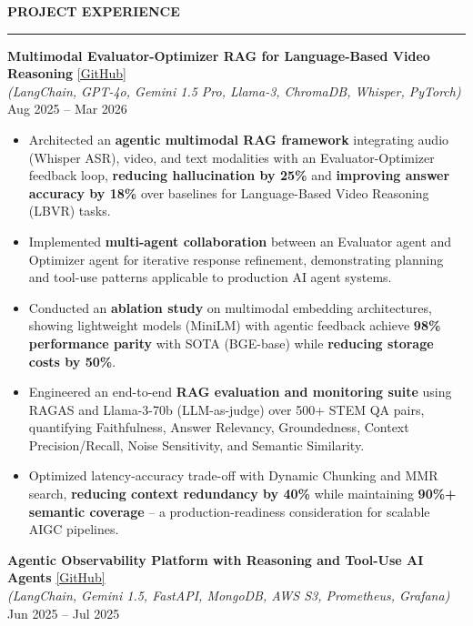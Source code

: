 \documentclass[letterpaper,10.5pt]{extarticle}
\newcommand{\resumesection}[1]{%
    \vspace{6pt}%
    \noindent\textbf{#1}\vspace{-5pt}%
    \\\noindent\rule{\textwidth}{0.5pt}%
    \vspace{1pt}%
}
\begin{document}
\resumesection{PROJECT EXPERIENCE}

\noindent\textbf{Multimodal Evaluator-Optimizer RAG for Language-Based Video Reasoning}
\hfill \href{https://github.com/slowloris-98/Evaluator-Optimizer-RAG}{[GitHub]}\\
\textit{(LangChain, GPT-4o, Gemini 1.5 Pro, Llama-3, ChromaDB, Whisper, PyTorch)} \hfill Aug 2025 -- Mar 2026

\begin{itemize}[leftmargin=12pt, topsep=1pt, itemsep=0pt, parsep=0pt]
    \item Architected an \textbf{agentic multimodal RAG framework} integrating audio (Whisper ASR), video, and text modalities with an Evaluator-Optimizer feedback loop, \textbf{reducing hallucination by 25\%} and \textbf{improving answer accuracy by 18\%} over baselines for Language-Based Video Reasoning (LBVR) tasks.
    \item Implemented \textbf{multi-agent collaboration} between an Evaluator agent and Optimizer agent for iterative response refinement, demonstrating planning and tool-use patterns applicable to production AI agent systems.
    \item Conducted an \textbf{ablation study} on multimodal embedding architectures, showing lightweight models (MiniLM) with agentic feedback achieve \textbf{98\% performance parity} with SOTA (BGE-base) while \textbf{reducing storage costs by 50\%}.
    \item Engineered an end-to-end \textbf{RAG evaluation and monitoring suite} using RAGAS and Llama-3-70b (LLM-as-judge) over 500+ STEM QA pairs, quantifying Faithfulness, Answer Relevancy, Groundedness, Context Precision/Recall, Noise Sensitivity, and Semantic Similarity.
    \item Optimized latency-accuracy trade-off with Dynamic Chunking and MMR search, \textbf{reducing context redundancy by 40\%} while maintaining \textbf{90\%+ semantic coverage} -- a production-readiness consideration for scalable AIGC pipelines.
\end{itemize}

\vspace{4pt}

\noindent\textbf{Agentic Observability Platform with Reasoning and Tool-Use AI Agents}
\hfill \href{https://github.com/slowloris-98/Agentic-Observability-BMC}{[GitHub]}\\
\textit{(LangChain, Gemini 1.5, FastAPI, MongoDB, AWS S3, Prometheus, Grafana)} \hfill Jun 2025 -- Jul 2025
\end{document}
